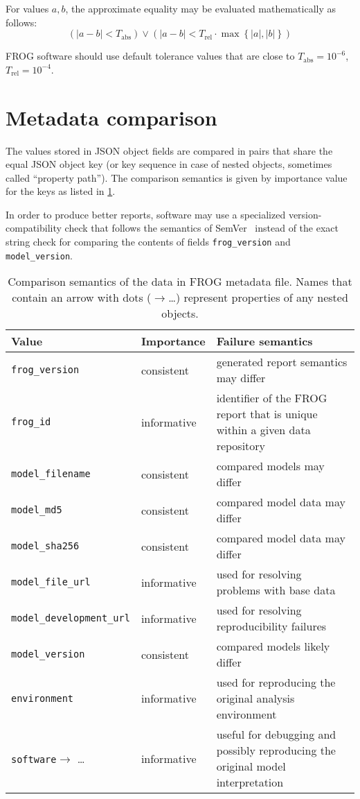 For values $a, b$, the approximate equality may be evaluated mathematically as follows:
\[\left(|a-b|<T_{\text{abs}}\right) \lor \left(|a-b|<T_{\text{rel}}\cdot \max\left\{|a|, |b|\right\}\right) \]

FROG software should use default tolerance values that are close to $T_\text{abs}=10^{-6}$, $T_\text{rel}=10^{-4}$.

\section{Metadata comparison}

The values stored in JSON object fields are compared in pairs that share the equal JSON object key (or key sequence in case of nested objects, sometimes called ``property path'').
The comparison semantics is given by importance value for the keys as listed in \cref{tab:cmpmeta}.

In order to produce better reports, software may use a specialized version-compatibility check that follows the semantics of SemVer~\cite{semver} instead of the exact string check for comparing the contents of fields \verb|frog_version| and \verb|model_version|.

\begin{table}\tablefont
\begin{tabular}{llp{30em}}
\toprule
Value & Importance & Failure semantics \\
\midrule
\verb|frog_version|
 & consistent
 & generated report semantics may differ
 \\
\verb|frog_id|
 & informative
 & identifier of the FROG report that is unique within a given data repository
 \\
\verb|model_filename|
 & consistent
 & compared models may differ
 \\
\verb|model_md5|
 & consistent
 & compared model data may differ
 \\
\verb|model_sha256|
 & consistent
 & compared model data may differ
 \\
\verb|model_file_url|
 & informative
 & used for resolving problems with base data
 \\
\verb|model_development_url|
 & informative
 & used for resolving reproducibility failures
 \\
\verb|model_version|
 & consistent
 & compared models likely differ
 \\
\verb|environment|
 & informative
 & used for reproducing the original analysis environment
 \\
\verb|software|$\to$ \dots
 & informative
 & useful for debugging and possibly reproducing the original model interpretation
 \\
\bottomrule
\end{tabular}
\caption[Comparison semantics of FROG metadata file.]{Comparison semantics of the data in FROG metadata file. Names that contain an arrow with dots ($\to$\dots) represent properties of any nested objects.}
\label{tab:cmpmeta}
\end{table}


